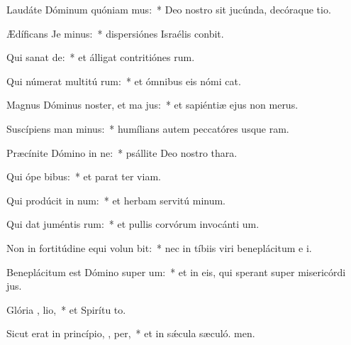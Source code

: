 \item Laudáte Dóminum quóniam   mus:~* Deo nostro sit jucúnda, decóraque tio.
\item Ædíficans Je minus:~* dispersiónes Israélis conbit.
\item Qui sanat  de:~* et álligat contritiónes rum.
\item Qui númerat multitú rum:~* et ómnibus eis nómi cat.
\item Magnus Dóminus noster, et ma  jus:~* et sapiéntiæ ejus non  merus.
\item Suscípiens man minus:~* humílians autem peccatóres usque  ram.
\item Præcínite Dómino in ne:~* psállite Deo nostro  thara.
\item Qui ópe  bibus:~* et parat ter viam.
\item Qui prodúcit in  num:~* et herbam servitú minum.
\item Qui dat juméntis  rum:~* et pullis corvórum invocánti um.
\item Non in fortitúdine equi volun bit:~* nec in tíbiis viri beneplácitum e i.
\item Beneplácitum est Dómino super  um:~* et in eis, qui sperant super misericórdi jus.
\item Glória ,  lio,~* et Spirítu to.
\item Sicut erat in princípio,  ,  per,~* et in sǽcula sæculó. men.
